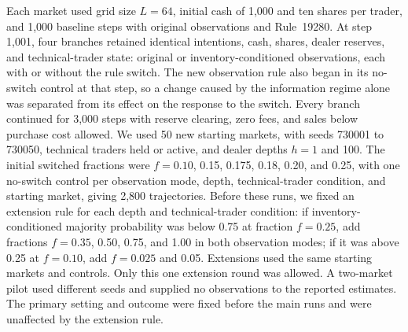 Each market used grid size $L=64$, initial cash of 1,000 and ten shares
per trader, and 1,000 baseline steps with original observations and
Rule~19280. At step 1,001, four branches retained identical intentions,
cash, shares, dealer reserves, and technical-trader state: original or
inventory-conditioned observations, each with or without the rule switch.
The new observation rule also began in its no-switch control at that
step, so a change caused by the information regime alone was separated
from its effect on the response to the switch. Every branch continued
for 3,000 steps with reserve clearing, zero fees, and sales below
purchase cost allowed. We used 50 new starting markets, with seeds
730001 to 730050, technical traders held or active, and dealer depths
$h=1$ and 100. The initial switched fractions were $f=0.10$, 0.15,
0.175, 0.18, 0.20, and 0.25, with one no-switch control per observation
mode, depth, technical-trader condition, and starting market, giving
2,800 trajectories. Before these runs, we fixed an extension rule for
each depth and technical-trader condition: if inventory-conditioned
majority probability was below 0.75 at fraction $f=0.25$, add fractions
$f=0.35$, 0.50, 0.75, and 1.00 in both observation modes; if it was
above 0.25 at $f=0.10$, add $f=0.025$ and 0.05. Extensions used the same
starting markets and controls. Only this one extension round was
allowed. A two-market pilot used different seeds and supplied no
observations to the reported estimates. The primary setting and
outcome were fixed before the main runs and were unaffected by the
extension rule.

